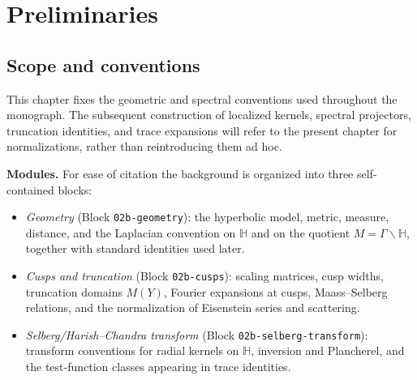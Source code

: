 
\chapter{Preliminaries}\label{chap:preliminaries}

\providecommand{\vol}{\operatorname{vol}}
\providecommand{\length}{\operatorname{length}}

\section{Scope and conventions}\label{sec:prelim-scope}

This chapter fixes the geometric and spectral conventions used throughout the
monograph.  The subsequent construction of localized kernels, spectral projectors,
truncation identities, and trace expansions will refer to the present chapter for
normalizations, rather than reintroducing them ad hoc.

\medskip
\noindent
\textbf{Modules.}
For ease of citation the background is organized into three self-contained blocks:
\begin{itemize}[leftmargin=2em]
  \item \emph{Geometry} (Block \texttt{02b-geometry}): the hyperbolic model, metric,
  measure, distance, and the Laplacian convention on $\mathbb H$ and on the quotient
  $M=\Gamma\backslash\mathbb H$, together with standard identities used later.
  \item \emph{Cusps and truncation} (Block \texttt{02b-cusps}): scaling matrices,
  cusp widths, truncation domains $M(Y)$, Fourier expansions at cusps, Maass--Selberg
  relations, and the normalization of Eisenstein series and scattering.
  \item \emph{Selberg/Harish--Chandra transform} (Block \texttt{02b-selberg-transform}):
  transform conventions for radial kernels on $\mathbb H$, inversion and Plancherel,
  and the test-function classes appearing in trace identities.
\end{itemize}

